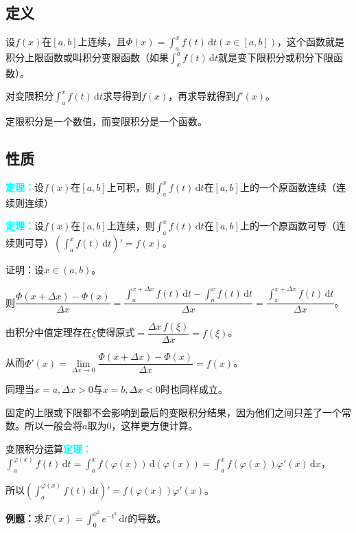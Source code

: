 \documentclass[UTF8, 12pt]{ctexart}
\begin{document}
        \subsection{定义}

        设$f(x)$在$[a,b]$上连续，且$\Phi(x)=\int_a^xf(t)\,\textrm{d}t(x\in[a,b])$，这个函数就是积分上限函数或叫积分变限函数（如果$\int_x^af(t)\,\textrm{d}t$就是变下限积分或积分下限函数）。

        对变限积分$\int_{a}^xf(t)\,\textrm{d}t$求导得到$f(x)$，再求导就得到$f'(x)$。

        定限积分是一个数值，而变限积分是一个函数。

        \subsection{性质}

        \textcolor{aqua}{\textbf{定理：}}设$f(x)$在$[a,b]$上可积，则$\int_a^xf(t)\,\textrm{d}t$在$[a,b]$上的一个原函数连续（连续则连续）

        \textcolor{aqua}{\textbf{定理：}}设$f(x)$在$[a,b]$上连续，则$\int_a^xf(t)\,\textrm{d}t$在$[a,b]$上的一个原函数可导（连续则可导）$(\int_a^xf(t)\,\textrm{d}t)'=f(x)$。

        证明：设$x\in(a,b)$。

        则$\dfrac{\Phi(x+\Delta x)-\Phi(x)}{\Delta x}=\dfrac{\int_a^{x+\Delta x}f(t)\,\textrm{d}t-\int_a^xf(t)\,\textrm{d}t}{\Delta x}=\dfrac{\int_x^{x+\Delta x}f(t)\,\textrm{d}t}{\Delta x}$。

        由积分中值定理存在$\xi$使得原式$=\dfrac{\Delta x\,f(\xi)}{\Delta x}=f(\xi)$。

        从而$\Phi'(x)=\lim\limits_{\Delta x\to 0}\dfrac{\Phi(x+\Delta x)-\Phi(x)}{\Delta x}=f(x)$。

        同理当$x=a,\Delta x>0$与$x=b,\Delta x<0$时也同样成立。

        固定的上限或下限都不会影响到最后的变限积分结果，因为他们之间只差了一个常数。所以一般会将$a$取为0，这样更方便计算。

        变限积分运算\textcolor{aqua}{\textbf{定理：}}$\int_a^{\varphi(x)}f(t)\,\textrm{d}t=\int_a^xf(\varphi(x))\,\textrm{d}(\varphi(x))=\int_a^xf(\varphi(x))\varphi'(x)\,\textrm{d}x$，

        所以$(\int_a^{\varphi(x)}f(t)\,\textrm{d}t)'=f(\varphi(x))\varphi'(x)$。

        \textbf{例题：}求$F(x)=\int_0^{x^2}e^{-t^2}\,\textrm{d}t$的导数。
\end{document}
